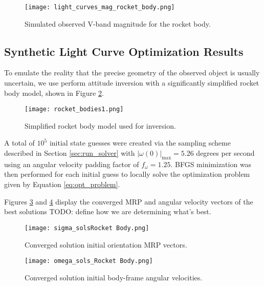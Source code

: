 \documentclass[a4paper,twocolumn]{spaceDebrisC} %
\newcommand{\figsmall}[0]{0.3\textwidth}
\begin{document}
\begin{figure}[H]
  \centering
  \texttt{[image: light\_curves\_mag\_rocket\_body.png]}
  \caption{Simulated observed V-band magnitude for the rocket body.}
  \label{fig:obs_mag_synth}
\end{figure}


\subsection{Synthetic Light Curve Optimization Results}

To emulate the reality that the precise geometry of the observed object is usually uncertain, we use perform attitude inversion with a significantly simplified rocket body model, shown in Figure \ref{fig:inv_model}.

\begin{figure}[H]
  \centering
  \texttt{[image: rocket\_bodies1.png]}
  \caption{Simplified rocket body model used for inversion.}
  \label{fig:inv_model}
\end{figure}

A total of $10^5$ initial state guesses were created via the sampling scheme described in Section \ref{sec:run_solver} with $|\omega(0)|_\text{max}=5.26$ degrees per second using an angular velocity padding factor of $f_\omega=1.25$. BFGS minimization was then performed for each initial guess to locally solve the optimization problem given by Equation \ref{eq:opt_problem}.

Figures \ref{fig:sigma_sols1} and \ref{fig:omega_sols1} display the converged MRP and angular velocity vectors of the best solutions TODO: define how we are determining what's best.

\begin{figure}[H]
  \centering
  \texttt{[image: sigma\_solsRocket Body.png]}
  \caption{Converged solution initial orientation MRP vectors.}
  \label{fig:sigma_sols1}
\end{figure}

\begin{figure}[H]
  \centering
  \texttt{[image: omega\_sols\_Rocket Body.png]}
  \caption{Converged solution initial body-frame angular velocities.}
  \label{fig:omega_sols1}
\end{figure}
\end{document}
